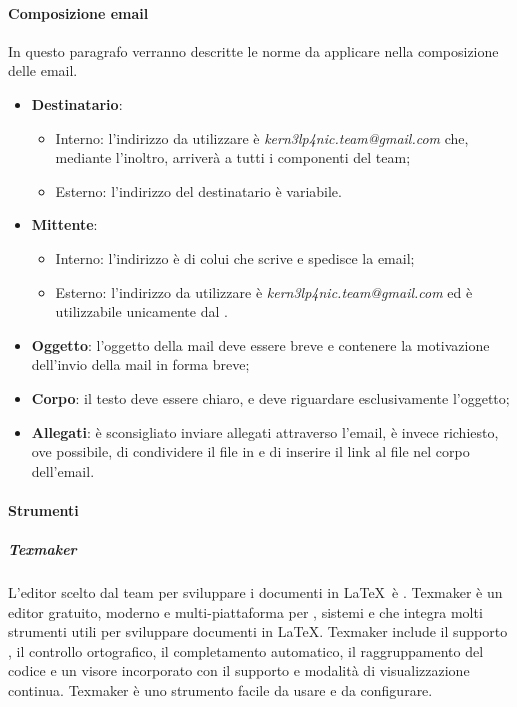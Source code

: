 \documentclass[../NormeDiProgetto_v4.0.0.tex]{subfiles}
\begin{document}
			\paragraph{Composizione email}
				In questo paragrafo verranno descritte le norme da applicare nella
				composizione delle email.
				\begin{itemize}
					\item \textbf{Destinatario}:
					\begin{itemize}
						\item Interno: l'indirizzo da utilizzare è \textit{kern3lp4nic.team@gmail.com} che, mediante l'inoltro, arriverà a tutti i componenti del team;
						\item Esterno: l'indirizzo del destinatario è variabile.
					\end{itemize}
					\item \textbf{Mittente}:
					\begin{itemize}
						\item Interno: l'indirizzo è di colui che scrive e spedisce la email;
						\item Esterno: l'indirizzo da utilizzare è \textit{kern3lp4nic.team@gmail.com} ed è utilizzabile unicamente dal \responsabilediprogetto.
					\end{itemize}
					\item \textbf{Oggetto}: l'oggetto della mail deve essere breve e contenere la motivazione dell'invio della mail in forma breve;
					\item \textbf{Corpo}: il testo deve essere chiaro, e deve riguardare esclusivamente l'oggetto;
					\item \textbf{Allegati}: è sconsigliato inviare allegati attraverso l'email, è invece richiesto, ove possibile, di condividere il file in  e di inserire il link al file nel corpo dell'email.
				\end{itemize}

			\paragraph{Strumenti}
				\subparagraph{Texmaker}
				L'editor scelto dal team per sviluppare i documenti in \LaTeX\ è . Texmaker è un editor gratuito, moderno e multi-piattaforma per , sistemi  e  che integra molti strumenti utili per sviluppare documenti in \LaTeX. Texmaker include il supporto , il controllo ortografico, il completamento automatico, il raggruppamento del codice e un visore incorporato  con il supporto  e modalità di visualizzazione continua. Texmaker è uno strumento facile da usare e da configurare.
\end{document}
